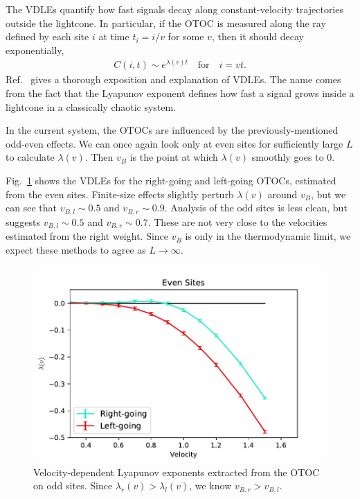 \documentclass[aps,prx,reprint,superscriptaddress, longbibliography]{revtex4-1}
\newcommand{\charlie}[1]{{\color{Magenta}{{#1}}}}
\begin{document}
The VDLEs quantify how fast signals decay along constant-velocity trajectories outside the lightcone. In particular, if the OTOC is measured along the ray defined by each site $i$ at time $t_i = i/v$ for some $v$, then it should decay exponentially,
\begin{align}
	C(i, t) \sim e^{\lambda(v)t}\quad\text{for}\quad i = vt.
\end{align}
Ref.~\cite{Khemani2018lambda} gives a thorough exposition and explanation of VDLEs. The name comes from the fact that the Lyapunov exponent defines how fast a signal grows inside a lightcone in a classically chaotic system.

In the current system, the OTOCs are influenced by the previously-mentioned odd-even effects. We can once again look only at even sites for sufficiently large $L$ to calculate $\lambda(v)$. Then $v_B$ is the point at which $\lambda(v)$ smoothly goes to 0.

Fig.~\ref{fig:vdle} shows the VDLEs for the right-going and left-going OTOCs, estimated from the even sites. Finite-size effects slightly perturb $\lambda(v)$ around $v_B$, but we can see that $v_{B,l} \sim 0.5$ and $v_{B,r} \sim 0.9$. Analysis of the odd sites is less clean, but suggests $v_{B,l} \sim 0.5$ and $v_{B,r} \sim 0.7$.
These are not very close to the velocities estimated from the right weight. Since $v_B$ is \charlie{well defined} only in the thermodynamic limit, we expect these methods to agree as $L\to\infty$.

\begin{figure}
	\includegraphics[width=\columnwidth]{vdle}
	\caption{Velocity-dependent Lyapunov exponents extracted from the OTOC on odd sites. Since $\lambda_r(v)>\lambda_l(v)$, we know $v_{B,r}>v_{B,l}$.}
	\label{fig:vdle}
\end{figure}
\end{document}
